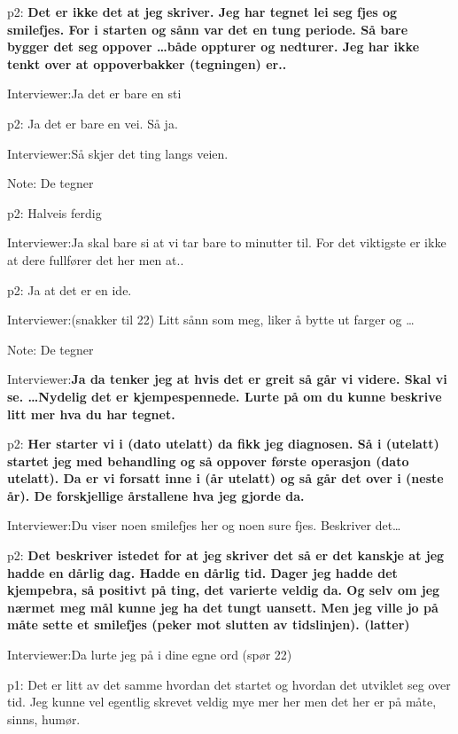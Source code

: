 \documentclass[../../MasterThesis.tex]{subfiles}
\begin{document}
\textcolor{myYellow} {p2:} \textbf{Det er ikke det at jeg skriver. Jeg har tegnet lei seg fjes og smilefjes. For i starten og sånn var det en tung periode. Så bare bygger det seg oppover \dots både oppturer og nedturer. Jeg har ikke tenkt over at oppoverbakker (tegningen) er..}

\textcolor{myBlue} {Interviewer:}Ja det er bare en sti

\textcolor{myYellow} {p2:} Ja det er bare en vei. Så ja.

\textcolor{myBlue} {Interviewer:}Så skjer det ting langs veien.

\textcolor{myGrey}{Note:} De tegner

\textcolor{myYellow} {p2:} Halveis ferdig

\textcolor{myBlue} {Interviewer:}Ja skal bare si at vi tar bare to minutter til. For det viktigste er ikke at dere fullfører det her men at..

\textcolor{myYellow} {p2:} Ja at det er en ide.

\textcolor{myBlue} {Interviewer:}(snakker til 22) Litt sånn som meg, liker å bytte ut farger og \dots

\textcolor{myGrey}{Note:} De tegner

\textcolor{myBlue} {Interviewer:}\textbf{Ja da tenker jeg at hvis det er greit så går vi videre. Skal vi se. \dots Nydelig det er kjempespennede. Lurte på om du kunne beskrive litt mer hva du har tegnet.}

\textcolor{myYellow} {p2:} \textbf{Her starter vi i (dato utelatt) da fikk jeg diagnosen. Så i (utelatt) startet jeg med behandling og så oppover første operasjon (dato utelatt). Da er vi forsatt inne i (år utelatt) og så går det over i (neste år). De forskjellige årstallene hva jeg gjorde da.}

\textcolor{myBlue} {Interviewer:}Du viser noen smilefjes her og noen sure fjes. Beskriver det\dots

\textcolor{myYellow} {p2:} \textbf{Det beskriver istedet for at jeg skriver det så er det kanskje at jeg hadde en dårlig dag. Hadde en dårlig tid. Dager jeg hadde det kjempebra, så positivt på ting, det varierte veldig da. Og selv om jeg nærmet meg mål kunne jeg ha det tungt uansett. Men jeg ville jo på måte sette et smilefjes (peker mot slutten av tidslinjen). (latter)}

\textcolor{myBlue} {Interviewer:}Da lurte jeg på i dine egne ord (spør 22)

\textcolor{myGreen} {p1:} Det er litt av det samme hvordan det startet og hvordan det utviklet seg over tid. Jeg kunne vel egentlig skrevet veldig mye mer her men det her er på måte, sinns, humør.
\end{document}
